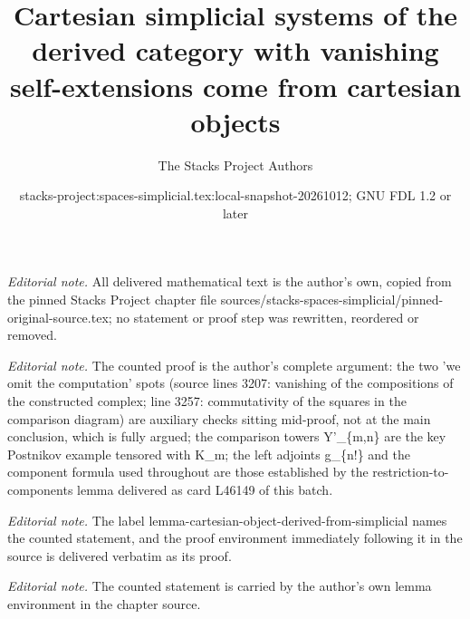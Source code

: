 \documentclass{stacks-project}
\title{Cartesian simplicial systems of the derived category with vanishing self-extensions come from cartesian objects}
\author{The Stacks Project Authors}
\date{stacks-project:spaces-simplicial.tex:local-snapshot-20261012; GNU FDL 1.2 or later}
\theoremstyle{plain}
\theoremstyle{definition}
\theoremstyle{remark}
\numberwithin{equation}{subsection}
\begin{document}
\maketitle
\noindent\textit{Editorial note.} All delivered mathematical text is the author's own, copied from the pinned Stacks Project chapter file sources/stacks-spaces-simplicial/pinned-original-source.tex; no statement or proof step was rewritten, reordered or removed.\par\medskip
\noindent\textit{Editorial note.} The counted proof is the author's complete argument: the two 'we omit the computation' spots (source lines 3207: vanishing of the compositions of the constructed complex; line 3257: commutativity of the squares in the comparison diagram) are auxiliary checks sitting mid-proof, not at the main conclusion, which is fully argued; the comparison towers Y'\_\{m,n\} are the key Postnikov example tensored with K\_m; the left adjoints g\_\{n!\} and the component formula used throughout are those established by the restriction-to-components lemma delivered as card L46149 of this batch.\par\medskip
\noindent\textit{Editorial note.} The label lemma-cartesian-object-derived-from-simplicial names the counted statement, and the proof environment immediately following it in the source is delivered verbatim as its proof.\par\medskip
\noindent\textit{Editorial note.} The counted statement is carried by the author's own lemma environment in the chapter source.\par\medskip
\end{document}
